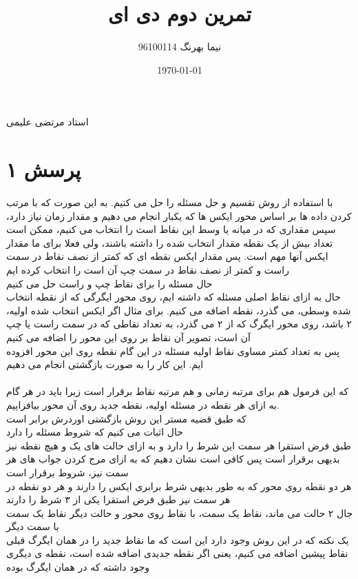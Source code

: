 \documentclass[a4paper]{article}
\title{تمرین دوم دی ای}
\author{نیما بهرنگ 96100114}
\date{\today}
\begin{document}
\maketitle
\begin{center}
استاد مرتضی علیمی
\end{center}

\section*{پرسش ۱}
با استفاده از روش تقسیم و حل مسئله را حل می کنیم. به این صورت که با مرتب کردن داده ها بر اساس محور ایکس ها که یکبار انجام می دهیم و مقدار 
زمان نیاز دارد، سپس مقداری که در میانه یا وسط این نقاط است را انتخاب می کنیم، ممکن است تعداد بیش از یک نقطه مقدار انتخاب شده را داشته باشند، ولی فعلا برای ما مقدار ایکس آنها مهم است. پس مقدار ایکس نقطه ای که کمتر از نصف نقاط در سمت راست و کمتر از نصف نقاط در سمت چپ آن است را انتخاب کرده ایم\\
حال مسئله را برای نقاط چپ و راست حل می کنیم\\
حال به ازای نقاط اصلی مسئله که داشته ایم، روی محور ایگرگی که از نقطه انتخاب شده وسطی، می گذرد، نقطه اضافه می کنیم. برای مثال اگر ایکس انتخاب شده اولیه، ۲ باشد، روی محور ایگرگ که از ۲ می گذرد، به تعداد نقاطی که در سمت راست یا چپ آن است، تصویر آن نقاط بر روی این محور را اضافه می کنیم\\
پس به تعداد کمتر مساوی نقاط اولیه مسئله در این گام نقطه روی این محور افزوده ایم. این کار را به صورت بازگشتی انجام می دهیم\\
\\
که این فرمول هم برای مرتبه زمانی و هم مرتبه نقاط برقرار است زیرا باید در هر گام به ازای هر نقطه در مسئله اولیه، نقطه جدید روی آن محور بیافزاییم.\\
که طبق قضیه مستر این روش بازگشتی اوردرش برابر
است\\
حال اثبات می کنیم که شروط مسئله را دارد\\
طبق فرض استقرا هر سمت این شرط را دارد و به ازای حالت های یک و هیچ نقطه نیز بدیهی برقرار است پس کافی است نشان دهیم که به ازای مرج کردن جواب های هر سمت نیز، شروط برقرار است\\
هر دو نقطه روی محور که به طور بدیهی شرط برابری ایکس را دارند و هر دو نقطه در هر سمت نیز طبق فرض استقرا یکی از ۳ شرط را دارند\\
جال ۲ حالت می ماند، نقاط یک سمت، با نقاط روی محور و حالت دیگر نقاط یک سمت با سمت دیگر\\
یک نکته که در این روش وجود دارد این است که ما نقاط جدید را در همان ایگرگ قبلی نقاط پیشین اضافه می کنیم، یعنی اگر نقطه جدیدی اضافه شده است، نقطه ی دیگری وجود داشته که در همان ایگرگ بوده\\
\end{document}
